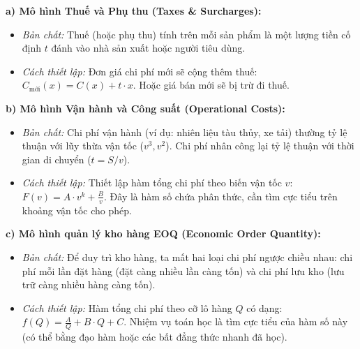 \documentclass[12pt]{article}
\begin{document}
	\begin{phuongphap}
		\textbf{a) Mô hình Thuế và Phụ thu (Taxes \& Surcharges):}
		\begin{itemize}
			\item \textit{Bản chất:} Thuế (hoặc phụ thu) tính trên mỗi sản phẩm là một lượng tiền cố định $t$ đánh vào nhà sản xuất hoặc người tiêu dùng.
			\item \textit{Cách thiết lập:} Đơn giá chi phí mới sẽ cộng thêm thuế: $C_{\text{mới}}(x) = C(x) + t \cdot x$. Hoặc giá bán mới sẽ bị trừ đi thuế.
		\end{itemize}
		
		\textbf{b) Mô hình Vận hành và Công suất (Operational Costs):}
		\begin{itemize}
			\item \textit{Bản chất:} Chi phí vận hành (ví dụ: nhiên liệu tàu thủy, xe tải) thường tỷ lệ thuận với lũy thừa vận tốc ($v^3, v^2$). Chi phí nhân công lại tỷ lệ thuận với thời gian di chuyển ($t = S/v$).
			\item \textit{Cách thiết lập:} Thiết lập hàm tổng chi phí theo biến vận tốc $v$: $F(v) = A \cdot v^k + \frac{B}{v}$. Đây là hàm số chứa phân thức, cần tìm cực tiểu trên khoảng vận tốc cho phép.
		\end{itemize}
		
		\textbf{c) Mô hình quản lý kho hàng EOQ (Economic Order Quantity):}
		\begin{itemize}
			\item \textit{Bản chất:} Để duy trì kho hàng, ta mất hai loại chi phí ngược chiều nhau: chi phí mỗi lần đặt hàng (đặt càng nhiều lần càng tốn) và chi phí lưu kho (lưu trữ càng nhiều hàng càng tốn).
			\item \textit{Cách thiết lập:} Hàm tổng chi phí theo cỡ lô hàng $Q$ có dạng: $f(Q) = \frac{A}{Q} + B \cdot Q + C$. Nhiệm vụ toán học là tìm cực tiểu của hàm số này (có thể bằng đạo hàm hoặc các bất đẳng thức nhanh đã học).
		\end{itemize}
	\end{phuongphap}
	
\end{document}
